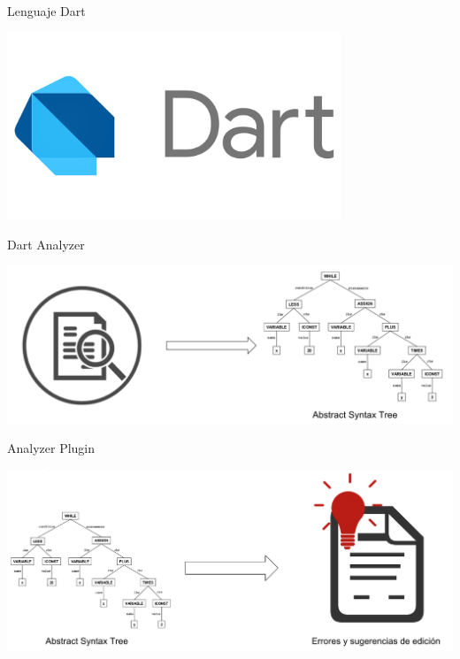 \documentclass[aspectratio=169,18pt]{beamer}
\begin{document}
\begin{frame}[fragile]{Lenguaje Dart}
	\begin{center}
		\includegraphics[width=0.75\textwidth]{images/dart.png}
	\end{center}
\end{frame}

\begin{frame}[fragile]{Dart Analyzer}
	\begin{center}
		\includegraphics[width=1.0\textwidth]{images/ast.png}
	\end{center}
\end{frame}

\begin{frame}[fragile]{Analyzer Plugin}
		\begin{center}
      \includegraphics[width=1.0\textwidth]{images/plugin.png}
		\end{center}
\end{frame}
\end{document}
